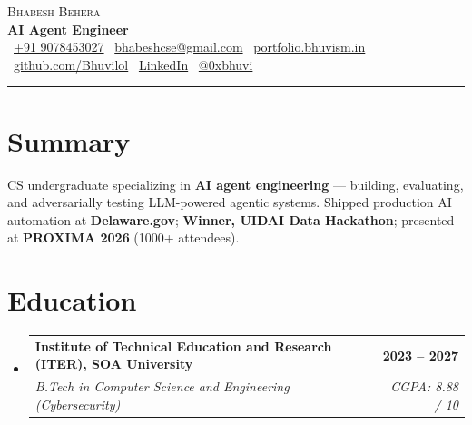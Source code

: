 \documentclass[letterpaper,10pt]{article}
\makeatletter
\newcommand{\resumeSubheading}[4]{
  \vspace{-1pt}\item
  \begin{tabular*}{1.0\textwidth}[t]{l@{\extracolsep{\fill}}r}
    \textbf{#1} & \textbf{\small #2} \\
    \textit{\small#3} & \textit{\small #4} \\
  \end{tabular*}\vspace{-5pt}
}
\newcommand{\resumeSubHeadingListStart}{
  \begin{itemize}[leftmargin=0.0in, label={}, itemsep=2pt, parsep=0pt, topsep=0pt]
}
\newcommand{\resumeSubHeadingListEnd}{
  \end{itemize}\vspace{-2pt}
}
\newcommand{\contactsep}{\hspace{4pt}\textbullet\hspace{4pt}}
\makeatother
\begin{document}

\begin{center}
    {\Huge \scshape Bhabesh Behera} \\[4pt]
    {\Large \bfseries \color{black} AI Agent Engineer} \\[8pt]

    \small
    \faPhone\ \href{tel:+919078453027}{+91 9078453027}
    \contactsep
    \faEnvelope\ \href{mailto:bhabeshcse@gmail.com}{bhabeshcse@gmail.com}
    \contactsep
    \faGlobe\ \href{https://portfolio.bhuvism.in/}{portfolio.bhuvism.in}
    \contactsep
    \faGithub\ \href{https://github.com/Bhuvilol}{github.com/Bhuvilol}
    \contactsep
    \faLinkedin\ \href{https://www.linkedin.com/in/bhabesh-behera-347469248/}{LinkedIn}
    \contactsep
    \faTwitter\ \href{https://x.com/0xbhuvi}{@0xbhuvi}
    \\[6pt]
    \color{black}\rule{\textwidth}{0.6pt}
\end{center}
\vspace{-8pt}


\section{Summary}
CS undergraduate specializing in \textbf{AI agent engineering} --- building, evaluating, and adversarially testing LLM-powered agentic systems. Shipped production AI automation at \textbf{Delaware.gov}; \textbf{Winner, UIDAI Data Hackathon}; presented at \textbf{PROXIMA 2026} (1000+ attendees).


\section{Education}
\resumeSubHeadingListStart
\resumeSubheading
  {Institute of Technical Education and Research (ITER), SOA University}{2023 -- 2027}
  {B.Tech in Computer Science and Engineering (Cybersecurity)}{CGPA: 8.88 / 10}
\resumeSubHeadingListEnd

\end{document}
